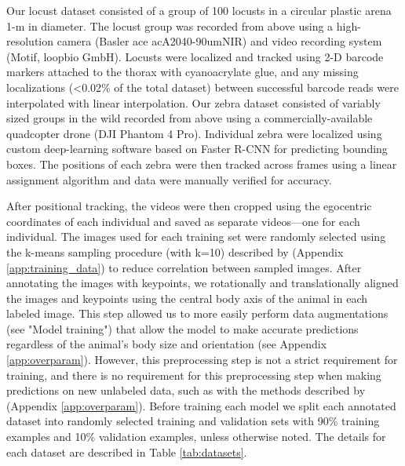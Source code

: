 \documentclass[11pt,a4paper,oneside]{book}
\begin{document}
Our locust dataset consisted of a group of 100 locusts in a circular plastic arena 1-m in diameter. The locust group was recorded from above using a high-resolution camera (Basler ace acA2040-90umNIR) and video recording system (Motif, loopbio GmbH). Locusts were localized and tracked using 2-D barcode markers \citep{graving2017pinpoint} attached to the thorax with cyanoacrylate glue, and any missing localizations (<0.02$\%$ of the total dataset) between successful barcode reads were interpolated with linear interpolation.  Our zebra dataset consisted of variably sized groups in the wild recorded from above using a commercially-available quadcopter drone (DJI Phantom 4 Pro). Individual zebra were localized using custom deep-learning software based on Faster R-CNN \citep{ren2015faster} for predicting bounding boxes. The positions of each zebra were then tracked across frames using a linear assignment algorithm \citep{munkres1957algorithms} and data were manually verified for accuracy.

After positional tracking, the videos were then cropped using the egocentric coordinates of each individual and saved as separate videos---one for each individual. The images used for each training set were randomly selected using the k-means sampling procedure (with k=10) described by \cite{pereira2019fast} (Appendix \ref{app:training_data}) to reduce correlation between sampled images. After annotating the images with keypoints, we rotationally and translationally aligned the images and keypoints using the central body axis of the animal in each labeled image. This step allowed us to more easily perform data augmentations (see "Model training") that allow the model to make accurate predictions regardless of the animal's body size and orientation (see Appendix \ref{app:overparam}). However, this preprocessing step is not a strict requirement for training, and there is no requirement for this preprocessing step when making predictions on new unlabeled data, such as with the methods described by \cite{pereira2019fast} (Appendix \ref{app:overparam}). Before training each model we split each annotated dataset into randomly selected training and validation sets with 90\% training examples and 10\% validation examples, unless otherwise noted. The details for each dataset are described in Table \ref{tab:datasets}.
\end{document}
